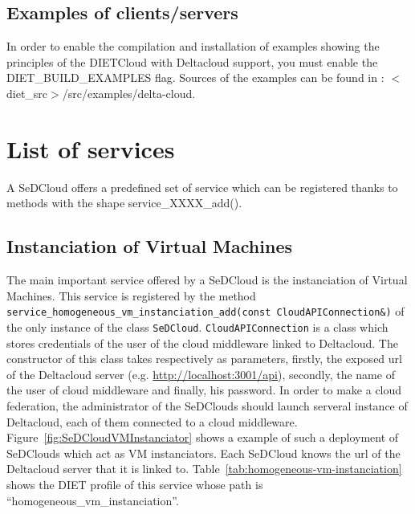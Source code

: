 \subsection{Examples of clients/servers}

In order to enable the compilation and installation of examples
showing the principles of the DIETCloud with Deltacloud support, you
must enable the DIET\_BUILD\_EXAMPLES flag. Sources of the examples
can be found in : $<$diet\_src$>$/src/examples/delta-cloud.


\section{List of services}

A SeDCloud offers a predefined set of service which can be registered
thanks to methods with the shape service\_XXXX\_add().

\subsection{Instanciation of Virtual Machines}

The main important service offered by a SeDCloud is the instanciation
of Virtual Machines. This service is registered by the method
\texttt{service\_homogeneous\_vm\_instanciation\_add(const
  CloudAPIConnection&)} of the only instance of the class
\texttt{SeDCloud}. \texttt{CloudAPIConnection} is a class which stores
credentials of the user of the cloud middleware linked to
Deltacloud. The constructor of this class takes respectively as
parameters, firstly, the exposed url of the Deltacloud server (e.g.
\url{http://localhost:3001/api}), secondly, the name of the user of
cloud middleware and finally, his password. In order to make a cloud
federation, the administrator of the SeDClouds should launch serveral
instance of Deltacloud, each of them connected to a cloud
middleware. Figure~\ref{fig:SeDCloudVMInstanciator} shows a example of
such a deployment of SeDClouds which act as VM instanciators.  Each
SeDCloud knows the url of the Deltacloud server that it is linked
to. Table~\ref{tab:homogeneous-vm-instanciation} shows the DIET
profile of this service whose path is
``homogeneous\_vm\_instanciation''.

